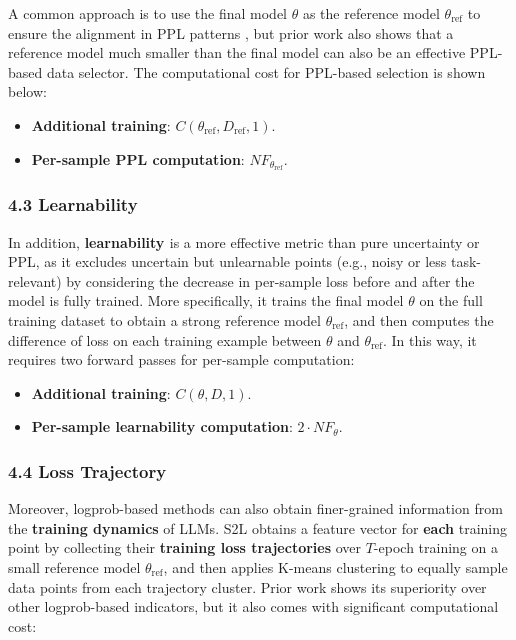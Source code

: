 A common approach is to use the final model $\theta$ as the reference model $\theta_{\text{ref}}$ to ensure the alignment in PPL patterns \cite{PPL1}, but prior work \cite{ankner2024perplexed} also shows that a reference model much smaller than the final model can also be an effective PPL-based data selector. The computational cost for PPL-based selection is shown below:

\begin{itemize}
    \item \textbf{Additional training}: $C(\theta_{\text{ref}}, D_{\text{ref}}, 1)$.
    \item \textbf{Per-sample PPL computation}: $NF_{\theta_{\text{ref}}}$.
\end{itemize}

\subsubsection*{4.3 Learnability}

In addition, \textbf{learnability \cite{Learnability1, Learnability2, Learnability3}} is a more effective metric than pure uncertainty or PPL, as it excludes uncertain but unlearnable points (e.g., noisy or less task-relevant) by considering the decrease in per-sample loss before and after the model is fully trained. More specifically, it trains the final model $\theta$ on the full training dataset to obtain a strong reference model $\theta_{\text{ref}}$, and then computes the difference of loss on each training example between $\theta$ and $\theta_{\text{ref}}$. In this way, it requires two forward passes for per-sample computation:

\begin{itemize}
    \item \textbf{Additional training}: $C(\theta, D, 1)$.
    \item \textbf{Per-sample learnability computation}: $2 \cdot NF_{\theta}$.
\end{itemize}

\subsubsection*{4.4 Loss Trajectory}

Moreover, logprob-based methods can also obtain finer-grained information from the \textbf{training dynamics} of LLMs. S2L \cite{yang2024s2l} obtains a feature vector for \textbf{each} training point by collecting their \textbf{training loss trajectories} over $T$-epoch training on a small reference model $\theta_{\text{ref}}$, and then applies K-means clustering to equally sample data points from each trajectory cluster. Prior work shows its superiority over other logprob-based indicators, but it also comes with significant computational cost:

